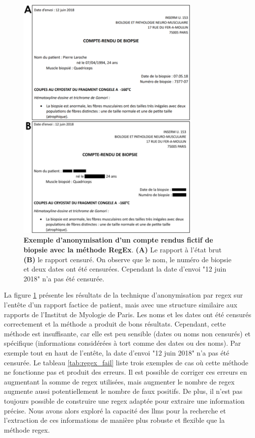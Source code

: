 \begin{figure}[htbp]
 \centering
 \includegraphics[width=0.8\textwidth]{figures/regex.png}
 \caption[Exemple anonymisation RegEx]{\textbf{Exemple d'anonymisation d'un compte rendus fictif de biopsie avec la méthode RegEx}. \textbf{(A)} Le rapport à l'état brut \textbf{(B)} le rapport censuré. On observe que le nom, le numéro de biopsie et deux dates ont été censurées. Cependant la date d'envoi "12 juin 2018" n'a pas été censurée.}
 \label{fig:regex}
\end{figure}

La figure \ref{fig:regex} présente les résultats de la technique d'anonymisation par \gls{regex} sur l'entête d'un rapport factice de patient, mais avec une structure similaire aux rapports de l'Institut de Myologie de Paris. Les noms et les dates ont été censurés correctement et la méthode a produit de bons résultats. Cependant, cette méthode est insuffisante, car elle est peu sensible (dates ou noms non censurés) et spécifique (informations considérées à tort comme des dates ou des noms). Par exemple tout en haut de l'entête, la date d'envoi "12 juin 2018" n'a pas été censurée. Le tableau \ref{tab:regex_fail} liste trois exemples de cas où cette méthode ne fonctionne pas et produit des erreurs. Il est possible de corriger ces erreurs en augmentant la somme de \gls{regex} utilisées, mais augmenter le nombre de \gls{regex} augmente aussi potentiellement le nombre de faux positifs. De plus, il n'est pas toujours possible de construire une \gls{regex} adaptée pour extraire une information précise. Nous avons alors exploré la capacité des \gls{llms} pour la recherche et l'extraction de ces informations de manière plus robuste et flexible que la méthode \gls{regex}.

